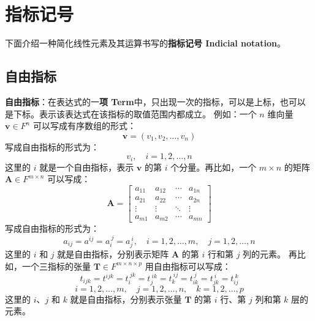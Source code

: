 \section{指标记号}

下面介绍一种简化线性元素及其运算书写的\textbf{指标记号 Indicial notation}。

\subsection{自由指标}

\textbf{自由指标}：在表达式的一\textbf{项 Term}中，只出现一次的指标，可以是上标，也可以是下标。表示该表达式在该指标的取值范围内都成立。
例如：一个 $n$ 维向量 $\mathbf{v}\in F^n$ 可以写成有序数组的形式：
\[
    \mathbf{v} = (v_1, v_2, \ldots, v_n)
\]
写成自由指标的形式为：
\[
    v_i, \quad i = 1, 2, \ldots, n
\]
这里的 $i$ 就是一个自由指标，表示 $\mathbf{v}$ 的第 $i$ 个分量。再比如，一个 $m \times n$ 的矩阵 $\mathbf{A} \in F^{m \times n}$ 可以写成：
\[
    \mathbf{A} = \begin{bmatrix}
        a_{11} & a_{12} & \cdots & a_{1n} \\
        a_{21} & a_{22} & \cdots & a_{2n} \\
        \vdots & \vdots & \ddots & \vdots \\
        a_{m1} & a_{m2} & \cdots & a_{mn}
    \end{bmatrix}
\]
写成自由指标的形式为：
\[
    a_{ij} = a^{ij} = a_i^{\ j} = a_j^{\ i}, \quad i = 1, 2, \ldots, m, \quad j = 1, 2, \ldots, n
\]
这里的 $i$ 和 $j$ 就是自由指标，分别表示矩阵 $\mathbf{A}$ 的第 $i$ 行和第 $j$ 列的元素。
再比如，一个三指标的张量 $\mathbf{T} \in F^{m \times n \times p}$ 用自由指标可以写成：
\[
    t_{ijk} = t^{ijk} = t_i^{\ jk} = t_j^{\ ik} = t_k^{\ ij} = t_{ik}^{\ j} = t_{jk}^{\ i} = t_{ij}^{\ k}
\]
\[
    i = 1, 2, \ldots, m, \quad j = 1, 2, \ldots, n, \quad k = 1, 2, \ldots, p
\]
这里的 $i$、$j$ 和 $k$ 就是自由指标，分别表示张量 $\mathbf{T}$ 的第 $i$ 行、第 $j$ 列和第 $k$ 层的元素。
\vspace{1em}

